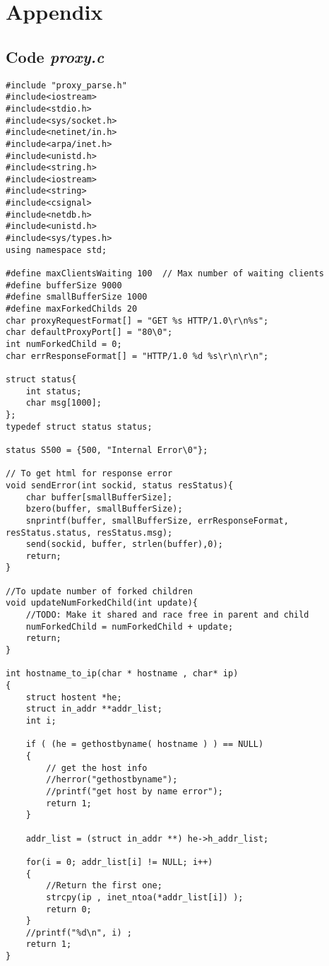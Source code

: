 \documentclass[11pt,a4paper,titlepage]{article}
\begin{document}
\section{Appendix}
\subsection{Code \textit{proxy.c}}
 
\begin{lstlisting}
#include "proxy_parse.h"
#include<iostream>
#include<stdio.h>
#include<sys/socket.h>
#include<netinet/in.h>
#include<arpa/inet.h>
#include<unistd.h>
#include<string.h>
#include<iostream>
#include<string>
#include<csignal>
#include<netdb.h>
#include<unistd.h>
#include<sys/types.h>
using namespace std;

#define maxClientsWaiting 100  // Max number of waiting clients
#define bufferSize 9000 
#define smallBufferSize 1000 
#define maxForkedChilds 20
char proxyRequestFormat[] = "GET %s HTTP/1.0\r\n%s";
char defaultProxyPort[] = "80\0";
int numForkedChild = 0;
char errResponseFormat[] = "HTTP/1.0 %d %s\r\n\r\n";

struct status{
	int status;
	char msg[1000];
};
typedef struct status status;

status S500 = {500, "Internal Error\0"};

// To get html for response error
void sendError(int sockid, status resStatus){
	char buffer[smallBufferSize];
	bzero(buffer, smallBufferSize);
	snprintf(buffer, smallBufferSize, errResponseFormat, resStatus.status, resStatus.msg);
	send(sockid, buffer, strlen(buffer),0);
	return;
}

//To update number of forked children
void updateNumForkedChild(int update){
	//TODO: Make it shared and race free in parent and child
	numForkedChild = numForkedChild + update;
	return;
}

int hostname_to_ip(char * hostname , char* ip)
{
    struct hostent *he;
    struct in_addr **addr_list;
    int i;
         
    if ( (he = gethostbyname( hostname ) ) == NULL) 
    {
        // get the host info
        //herror("gethostbyname");
		//printf("get host by name error");
        return 1;
    }
 
    addr_list = (struct in_addr **) he->h_addr_list;
     
    for(i = 0; addr_list[i] != NULL; i++) 
    {
        //Return the first one;
        strcpy(ip , inet_ntoa(*addr_list[i]) );
        return 0;
    }
    //printf("%d\n", i) ;
    return 1;
}


\end{lstlisting}
\end{document}
